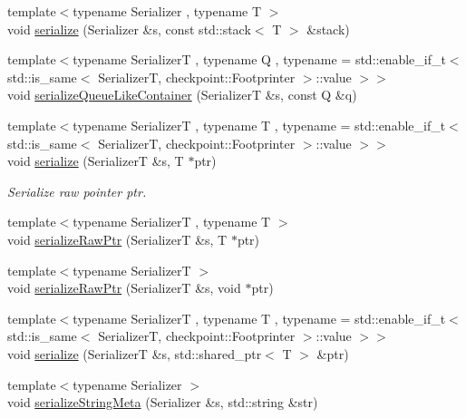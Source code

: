 \begin{DoxyCompactItemize}
{\footnotesize template$<$typename Serializer , typename T $>$ }\\void \hyperlink{namespacecheckpoint_a1d399ef63dc7723f1b4387e4605b3259}{serialize} (Serializer \&s, const std\+::stack$<$ T $>$ \&stack)
\item 
{\footnotesize template$<$typename SerializerT , typename Q , typename  = std\+::enable\+\_\+if\+\_\+t$<$    std\+::is\+\_\+same$<$      Serializer\+T,      checkpoint\+::\+Footprinter    $>$\+::value  $>$$>$ }\\void \hyperlink{namespacecheckpoint_a33956387419a85cfe810fbce88f5bdf9}{serialize\+Queue\+Like\+Container} (SerializerT \&s, const Q \&q)
\item 
{\footnotesize template$<$typename SerializerT , typename T , typename  = std\+::enable\+\_\+if\+\_\+t$<$    std\+::is\+\_\+same$<$      Serializer\+T,      checkpoint\+::\+Footprinter    $>$\+::value  $>$$>$ }\\void \hyperlink{namespacecheckpoint_a5242b8701b19ff5eeb7587fb4a07bfe9}{serialize} (SerializerT \&s, T $\ast$ptr)
\begin{DoxyCompactList}\small\item\em Serialize raw pointer {\ttfamily ptr}. \end{DoxyCompactList}\item 
{\footnotesize template$<$typename SerializerT , typename T $>$ }\\void \hyperlink{namespacecheckpoint_a6113644a35f5023a57e2ed3ca4814490}{serialize\+Raw\+Ptr} (SerializerT \&s, T $\ast$ptr)
\item 
{\footnotesize template$<$typename SerializerT $>$ }\\void \hyperlink{namespacecheckpoint_aaadeb0ab61d069afc8a97ec6b6dc630c}{serialize\+Raw\+Ptr} (SerializerT \&s, void $\ast$ptr)
\item 
{\footnotesize template$<$typename SerializerT , typename T , typename  = std\+::enable\+\_\+if\+\_\+t$<$    std\+::is\+\_\+same$<$      Serializer\+T,      checkpoint\+::\+Footprinter    $>$\+::value  $>$$>$ }\\void \hyperlink{namespacecheckpoint_aff1bebba5ce7fda79f83d2af8c859254}{serialize} (SerializerT \&s, std\+::shared\+\_\+ptr$<$ T $>$ \&ptr)
\item 
{\footnotesize template$<$typename Serializer $>$ }\\void \hyperlink{namespacecheckpoint_a1ea8e1ef9d0a10d26df77cb5309435aa}{serialize\+String\+Meta} (Serializer \&s, std\+::string \&str)
\item 

\end{DoxyCompactItemize}
